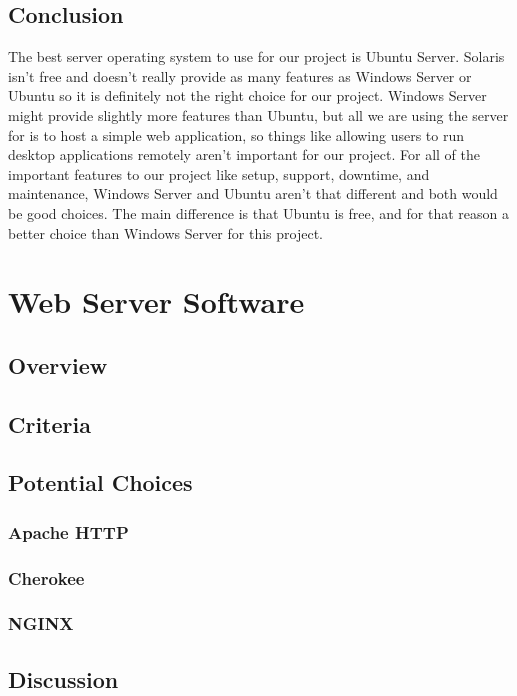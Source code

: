 \documentclass[onecolumn, draftclsnofoot,10pt, compsoc]{IEEEtran}
\begin{document}
\subsection{Conclusion}
The best server operating system to use for our project is Ubuntu Server. Solaris isn't free and doesn't really provide as many features as Windows Server or Ubuntu so it is definitely not the right choice for our project. Windows Server might provide slightly more features than Ubuntu, but all we are using the server for is to host a simple web application, so things like allowing users to run desktop applications remotely aren't important for our project. For all of the important features to our project like setup, support, downtime, and maintenance, Windows Server and Ubuntu aren't that different and both would be good choices. The main difference is that Ubuntu is free, and for that reason a better choice than Windows Server for this project.

\section{Web Server Software}

\subsection{Overview}

\subsection{Criteria}

\subsection{Potential Choices}

\subsubsection{Apache HTTP}

\subsubsection{Cherokee}

\subsubsection{NGINX}

\subsection{Discussion}
\end{document}
